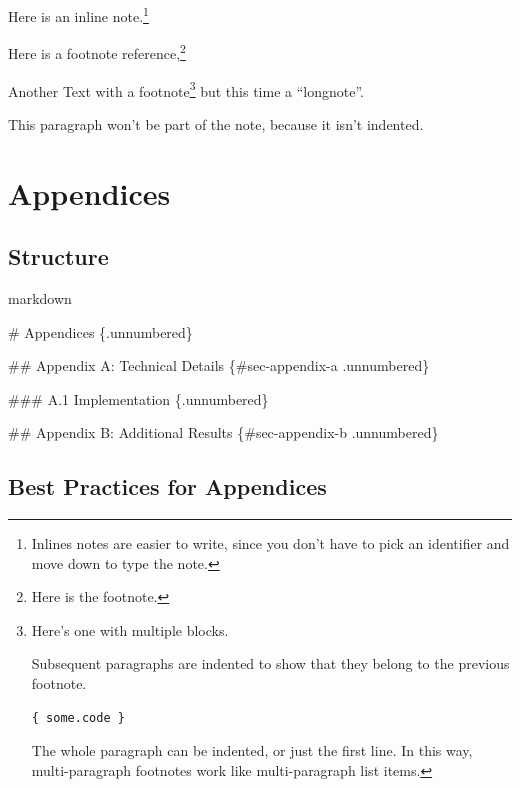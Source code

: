 \documentclass[
  11pt,
  letterpaper,
]{book}
\newenvironment{Shaded}{\begin{snugshade}}{\end{snugshade}}
\newcommand{\FunctionTok}[1]{\textcolor[rgb]{0.28,0.35,0.67}{#1}}
\begin{document}
Here is an inline note.\footnote{Inlines notes are easier to write,
  since you don't have to pick an identifier and move down to type the
  note.}

Here is a footnote reference,\footnote{Here is the footnote.}

Another Text with a footnote\footnote{Here's one with multiple blocks.

  Subsequent paragraphs are indented to show that they belong to the
  previous footnote.

\begin{Verbatim}
{ some.code }
\end{Verbatim}

  The whole paragraph can be indented, or just the first line. In this
  way, multi-paragraph footnotes work like multi-paragraph list items.}
but this time a ``longnote''.

This paragraph won't be part of the note, because it isn't indented.

\section*{Appendices}\label{appendices}


\subsection*{Structure}\label{structure}

markdown

\begin{Shaded}
\begin{Highlighting}[]
\FunctionTok{\# Appendices \{.unnumbered\}}

\FunctionTok{\#\# Appendix A: Technical Details \{\#sec{-}appendix{-}a .unnumbered\}}

\FunctionTok{\#\#\# A.1 Implementation \{.unnumbered\}}

\FunctionTok{\#\# Appendix B: Additional Results \{\#sec{-}appendix{-}b .unnumbered\}}
\end{Highlighting}
\end{Shaded}

\subsection*{Best Practices for
Appendices}\label{best-practices-for-appendices}
\end{document}
